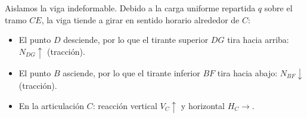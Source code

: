 
Aislamos la viga indeformable. Debido a la carga uniforme repartida $q$ sobre el tramo $CE$, la viga tiende a girar en sentido horario alrededor de $C$:
\begin{itemize}
    \item El punto $D$ desciende, por lo que el tirante superior $DG$ tira hacia arriba: $N_{DG} \uparrow$ (tracción).
    \item El punto $B$ asciende, por lo que el tirante inferior $BF$ tira hacia abajo: $N_{BF} \downarrow$ (tracción).
    \item En la articulación $C$: reacción vertical $V_C \uparrow$ y horizontal $H_C \rightarrow$.
\end{itemize}

